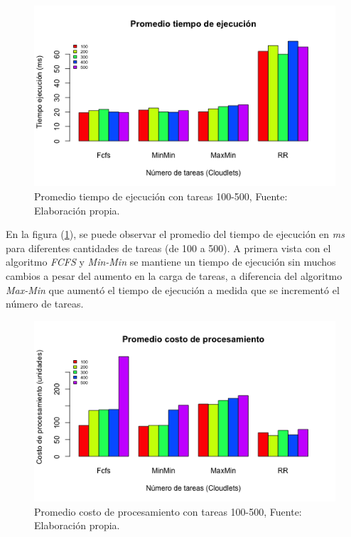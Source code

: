 \setcounter{figure}{24}
\renewcommand\thefigure{\arabic{figure}}
\begin{figure}[h!] 
	\centering
	\includegraphics[scale=0.6]{media/tiempoejecucionjpg}
	\caption{Promedio tiempo de ejecuci\'on con tareas 100-500, Fuente: Elaboraci\'on propia.}
	\label{fig:tiempo}
\end{figure}



En la figura (\ref{fig:tiempo}), se puede observar el promedio del tiempo de ejecuci\'on en \emph{ms} para diferentes cantidades de tareas (de 100 a 500). A primera vista con el algoritmo \textit{FCFS} y \textit{Min-Min} se mantiene un tiempo de ejecuci\'on sin muchos cambios a pesar del aumento en la carga de tareas, a diferencia del algoritmo \textit{Max-Min} que aument\'o el tiempo de ejecuci\'on a medida que se increment\'o el n\'umero de tareas.

\label{etiqueta}
\newpage

\renewcommand\thefigure{\arabic{figure}}
\begin{figure}[h!] 
	\centering
	\includegraphics[scale=0.6]{media/costoproce}
	\caption{Promedio costo de procesamiento con tareas 100-500, Fuente: Elaboraci\'on propia.}
	\label{fig:costo}
\end{figure}


